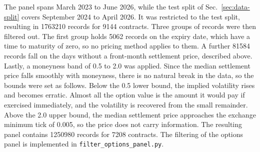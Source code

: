 The panel spans March 2023 to June 2026, while the test split of Sec.~\ref{sec:data-split} covers September 2024 to April 2026. It was restricted to the test split, resulting in \num{1763210} records for \num{9144} contracts. Three groups of records were then filtered out. The first group holds \num{5062} records on the expiry date, which have a time to maturity of zero, so no pricing method applies to them. A further \num{81584} records fall on the days without a front-month settlement price, described above. Lastly, a moneyness band of \num{0.5} to \num{2.0} was applied. Since the median settlement price falls smoothly with moneyness, there is no natural break in the data, so the bounds were set as follows. Below the \num{0.5} lower bound, the implied volatility rises and becomes erratic. Almost all the option value is the amount it would pay if exercised immediately, and the volatility is recovered from the small remainder. Above the \num{2.0} upper bound, the median settlement price approaches the exchange minimum tick of \SI{0.005}{\eurmwh}, so the price does not carry information. The resulting panel contains \num{1250980} records for \num{7208} contracts. The filtering of the options panel is implemented in \texttt{filter\_options\_panel.py}.
